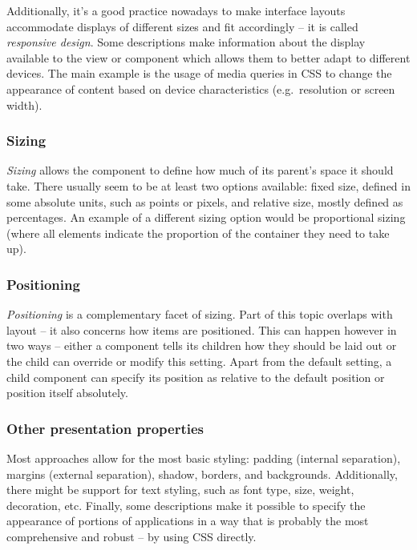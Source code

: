 Additionally, it's a good practice nowadays to make interface layouts accommodate displays of different sizes and fit accordingly -- it is called \emph{responsive design}.
Some descriptions make information about the display available to the view or component which allows them to better adapt to different devices.
The main example is the usage of media queries in CSS to change the appearance of content based on device characteristics (e.g.\ resolution or screen width).

\subsubsection{Sizing}
\emph{Sizing} allows the component to define how much of its parent's space it should take.
There usually seem to be at least two options available: fixed size, defined in some absolute units, such as points or pixels, and relative size, mostly defined as percentages.
An example of a different sizing option would be proportional sizing (where all elements indicate the proportion of the container they need to take up).

\subsubsection{Positioning}
\emph{Positioning} is a complementary facet of sizing.
Part of this topic overlaps with layout -- it also concerns how items are positioned.
This can happen however in two ways -- either a component tells its children how they should be laid out or the child can override or modify this setting.
Apart from the default setting, a child component can specify its position as relative to the default position or position itself absolutely.

\subsubsection{Other presentation properties}
Most approaches allow for the most basic styling: padding (internal separation), margins (external separation), shadow, borders, and backgrounds.
Additionally, there might be support for text styling, such as font type, size, weight, decoration, etc.
Finally, some descriptions make it possible to specify the appearance of portions of applications in a way that is probably the most comprehensive and robust -- by using CSS directly.
